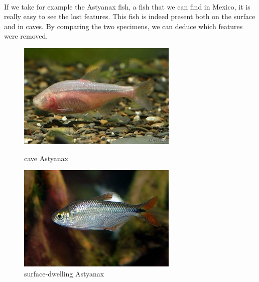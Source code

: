\documentclass[draft, final]{report}
\begin{document}
\paragraph{}
If we take for example the Astyanax fish, a fish that we can find in Mexico, it is really easy to see the lost features. This fish is indeed present both on the surface and in caves. By comparing the two specimens, we can deduce which features were removed.
\newline
\newline
\newline

\begin{figure}[!ht]
    \begin{minipage}[c]{.46\linewidth}
        \centering
        \includegraphics[scale=0.6]{LateX/Images/Astyanax1.png}
        \caption{cave Astyanax\cite{astyanax1}}
    \end{minipage}
    \hfill%
    \begin{minipage}[c]{.46\linewidth}
        \centering
        \includegraphics[scale=0.6]{LateX/Images/Astyanax2.png}
        \caption{surface-dwelling Astyanax\cite{astyanax2}}
    \end{minipage}
  \end{figure}
\clearpage
\end{document}
